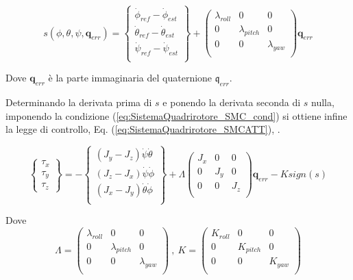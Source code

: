 \begin{equation}\label{eq:SistemaQuadrirotore_slideATT}
	s(\phi, \theta, \psi, \mathbf{q}_{err}) =  \begin{Bmatrix}
		\dot{\phi}_{ref} - \dot{\phi}_{est} \\
		\dot{\theta}_{ref} - \dot{\theta}_{est} \\
		\dot{\psi}_{ref} - \dot{\psi}_{est} \\
	\end{Bmatrix} + \begin{pmatrix}
		\lambda_{roll} & 0 & 0 \\
		0 & \lambda_{pitch} & 0 \\
		0 & 0 & \lambda_{yaw} \\
	\end{pmatrix} \mathbf{q}_{err}
\end{equation}

Dove $\mathbf{q}_{err}$ è la parte immaginaria del quaternione $\mathfrak{q}_{err}$.

Determinando la derivata prima di $s$ e ponendo la derivata seconda di $s$ nulla, imponendo la condizione (\ref{eq:SistemaQuadrirotore_SMC_cond}) si ottiene infine la legge di controllo, Eq. (\ref{eq:SistemaQuadrirotore_SMCATT}), \cite{DesTestCarm}.

\begin{equation}\label{eq:SistemaQuadrirotore_SMCATT}
\begin{Bmatrix}
\tau_x \\ \tau_y \\ \tau_z 
\end{Bmatrix} = - \begin{Bmatrix}
	(J_y -J_z)\dot{\psi} \dot{\theta} \\
	(J_z -J_x)\dot{\psi} \dot{\phi} \\
	(J_x -J_y)\dot{\theta} \dot{\phi} \\
\end{Bmatrix} +
	\Lambda
	\begin{pmatrix}
	J_x & 0 & 0 \\
	0 & J_y & 0 \\
	0 & 0 & J_z \\
	\end{pmatrix}
	\mathbf{q}_{err} 
	-
	K
	\textit{sign}(s)
\end{equation}

Dove 
\[
\Lambda = 
\begin{pmatrix}
\lambda_{roll} & 0 & 0 \\
0 & \lambda_{pitch} & 0 \\
0 & 0 & \lambda_{yaw} \\
\end{pmatrix} \ , \ 
K = \begin{pmatrix}
K_{roll} & 0 & 0 \\
0 & K_{pitch} & 0 \\
0 & 0 & K_{yaw} \\	
\end{pmatrix}
\]


